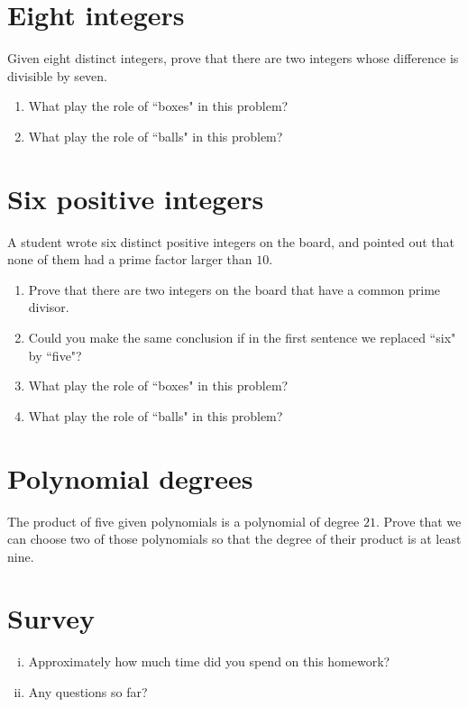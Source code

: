 \documentclass[10pt]{amsart}
\begin{document}
\section{Eight integers}\label{sec:eight_integers}
Given eight distinct integers, prove that there are two integers whose difference is divisible by seven.

\begin{enumerate}
	\item What play the role of ``boxes" in this problem?
	
	\item What play the role of ``balls" in this problem?
\end{enumerate}



\section{Six positive integers}\label{sec:six_positive_integers}
A student wrote six distinct positive integers on the board, and pointed out that none of them had a prime factor larger than $10$. 






\begin{enumerate}
	\item Prove that there are two integers on the board that have a common prime divisor.
	
	\item Could you make the same conclusion if in the first sentence we replaced ``six" by ``five"?
	
	
	\item What play the role of ``boxes" in this problem?
	
	\item What play the role of ``balls" in this problem?
\end{enumerate}



\section{Polynomial degrees}\label{sec:polynomial_degrees}
The product of five given polynomials is a polynomial of degree $21$. Prove that we can choose two of those polynomials so that the degree of their product is at least nine.







\section{Survey}
\begin{enumerate}[i.] 
\item Approximately how much time did you spend on this homework?
\item Any questions so far?
\end{enumerate}
\end{document}
